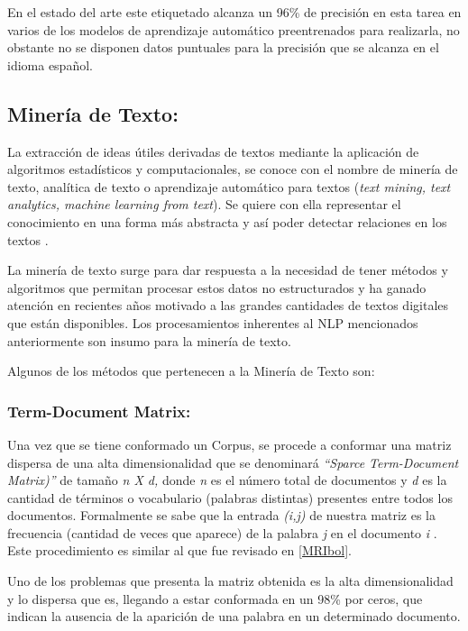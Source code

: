 \documentclass[
  10,
  openany]{book}
\begin{document}
En el estado del arte este etiquetado alcanza un 96\% de precisión en esta tarea en varios de los modelos de aprendizaje automático preentrenados para realizarla, no obstante no se disponen datos puntuales para la precisión que se alcanza en el idioma español.

\hypertarget{textmin}{%
\subsection{Minería de Texto:}\label{textmin}}

La extracción de ideas útiles derivadas de textos mediante la aplicación de algoritmos estadísticos y computacionales, se conoce con el nombre de minería de texto, analítica de texto o aprendizaje automático para textos (\emph{text mining, text analytics, machine learning from text}). Se quiere con ella representar el conocimiento en una forma más abstracta y así poder detectar relaciones en los textos \citep{aggarwal2018a}.

La minería de texto surge para dar respuesta a la necesidad de tener métodos y algoritmos que permitan procesar estos datos no estructurados \citep{miningt2012} y ha ganado atención en recientes años motivado a las grandes cantidades de textos digitales que están disponibles. Los procesamientos inherentes al NLP mencionados anteriormente son insumo para la minería de texto.

Algunos de los métodos que pertenecen a la Minería de Texto son:

\hypertarget{tdm}{%
\subsubsection{Term-Document Matrix:}\label{tdm}}

Una vez que se tiene conformado un Corpus, se procede a conformar una matriz dispersa de una alta dimensionalidad que se denominará \emph{``Sparce Term-Document Matrix)''} de tamaño \emph{n X d,} donde \emph{n} es el número total de documentos y \emph{d} es la cantidad de términos o vocabulario (palabras distintas) presentes entre todos los documentos. Formalmente se sabe que la entrada \emph{(i,j)} de nuestra matriz es la frecuencia (cantidad de veces que aparece) de la palabra \emph{j} en el documento \emph{i} . Este procedimiento es similar al que fue revisado en \ref{MRIbol}.

Uno de los problemas que presenta la matriz obtenida es la alta dimensionalidad y lo dispersa que es, llegando a estar conformada en un 98\% por ceros, que indican la ausencia de la aparición de una palabra en un determinado documento.
\end{document}
